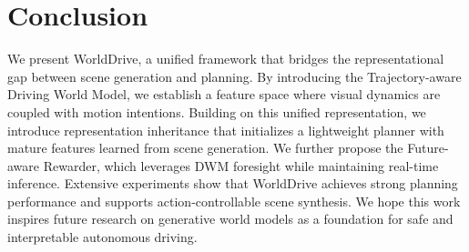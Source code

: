 \section{Conclusion}
We present WorldDrive, a unified framework that bridges the representational gap between scene generation and planning. By introducing the Trajectory-aware Driving World Model, we establish a feature space where visual dynamics are coupled with motion intentions. Building on this unified representation, we introduce representation inheritance that initializes a lightweight planner with mature features learned from scene generation. We further propose the Future-aware Rewarder, which leverages DWM foresight while maintaining real-time inference. Extensive experiments show that WorldDrive achieves strong planning performance and supports action-controllable scene synthesis. We hope this work inspires future research on generative world models as a foundation for safe and interpretable autonomous driving.
